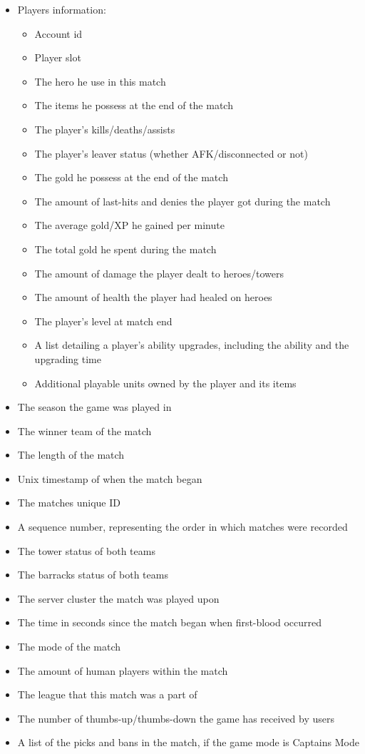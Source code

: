 \documentclass{article}
\begin{document}
\begin{itemize}
	\item Players information:
	\begin{itemize}
		\item Account id
		\item Player slot
		\item The hero he use in this match
		\item The items he possess at the end of the match
		\item The player's kills/deaths/assists
		\item The player's leaver status (whether AFK/disconnected or not)
		\item The gold he possess at the end of the match
		\item The amount of last-hits and denies the player got during the match
		\item The average gold/XP he gained per minute
		\item The total gold he spent during the match
		\item The amount of damage the player dealt to heroes/towers
		\item The amount of health the player had healed on heroes
		\item The player's level at match end
		\item A list detailing a player's ability upgrades, including the ability and the upgrading time
		\item Additional playable units owned by the player and its items
	\end{itemize}
	\item The season the game was played in
	\item The winner team of the match
	\item The length of the match
	\item Unix timestamp of when the match began
	\item The matches unique ID
	\item A sequence number, representing the order in which matches were recorded
	\item The tower status of both teams
	\item The barracks status of both teams
	\item The server cluster the match was played upon
	\item The time in seconds since the match began when first-blood occurred
	\item The mode of the match
	\item The amount of human players within the match
	\item The league that this match was a part of
	\item The number of thumbs-up/thumbs-down the game has received by users
	\item A list of the picks and bans in the match, if the game mode is Captains Mode
\end{itemize}
\end{document}
